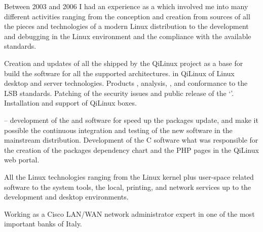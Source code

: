 Between 2003 and 2006 I had an experience as a
which involved me into many different activities ranging from the conception
and creation from sources of all the pieces and technologies of a modern Linux
distribution to the development and debugging in the Linux environment and
the compliance with the available standards.

\smallskip\noindent
\tasks
Creation and updates of all the  shipped by the QiLinux
project as a base for build the software for all the supported architectures.
 in QiLinux of Linux desktop and server technologies.
Products ,  analysis,
, and conformance to the LSB standards.
Patching of the security issues and public release of the
`'.
Installation and support of QiLinux boxes.

\smallskip\noindent
\software
{} --
development of the  and  software for
speed up the packages update, and make it possible the continuous
integration and testing of the new software in the mainstream distribution.
Development of the C software what was responsible for the creation
of the packages dependency chart and the PHP pages in the QiLinux web portal.

\tinyskip\noindent
\technologies
All the Linux technologies ranging from the Linux kernel plus user-space
related software
to the system tools, the local,
printing, and network services up to the development
and desktop environments. %




Working as a Cisco LAN/WAN network administrator expert in one of the most
important banks of Italy.

%

